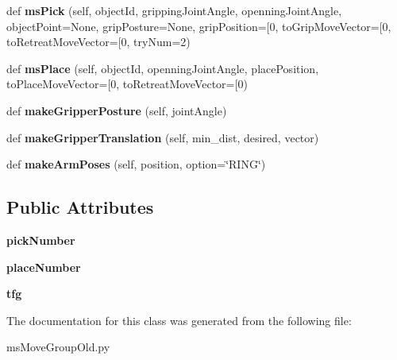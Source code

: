 \begin{DoxyCompactItemize}
\item 
def {\bfseries ms\+Pick} (self, object\+Id, gripping\+Joint\+Angle, openning\+Joint\+Angle, object\+Point=None, grip\+Posture=None, grip\+Position=\mbox{[}0, to\+Grip\+Move\+Vector=\mbox{[}0, to\+Retreat\+Move\+Vector=\mbox{[}0, try\+Num=2)\hypertarget{classmsMoveGroupOld_1_1msMoveGroup_a5859c9d9983ec4e03d57e56f348d4989}{}\label{classmsMoveGroupOld_1_1msMoveGroup_a5859c9d9983ec4e03d57e56f348d4989}

\item 
def {\bfseries ms\+Place} (self, object\+Id, openning\+Joint\+Angle, place\+Position, to\+Place\+Move\+Vector=\mbox{[}0, to\+Retreat\+Move\+Vector=\mbox{[}0)\hypertarget{classmsMoveGroupOld_1_1msMoveGroup_a366b600e9d9d02582df541d94734048d}{}\label{classmsMoveGroupOld_1_1msMoveGroup_a366b600e9d9d02582df541d94734048d}

\item 
def {\bfseries make\+Gripper\+Posture} (self, joint\+Angle)\hypertarget{classmsMoveGroupOld_1_1msMoveGroup_a18bb8b3ececb662a7580203354378e94}{}\label{classmsMoveGroupOld_1_1msMoveGroup_a18bb8b3ececb662a7580203354378e94}

\item 
def {\bfseries make\+Gripper\+Translation} (self, min\+\_\+dist, desired, vector)\hypertarget{classmsMoveGroupOld_1_1msMoveGroup_a933940b988af395523e3a9121d0aaffb}{}\label{classmsMoveGroupOld_1_1msMoveGroup_a933940b988af395523e3a9121d0aaffb}

\item 
def {\bfseries make\+Arm\+Poses} (self, position, option=\char`\"{}R\+I\+NG\char`\"{})\hypertarget{classmsMoveGroupOld_1_1msMoveGroup_ae4f947f53bd380cd899593735f11bea6}{}\label{classmsMoveGroupOld_1_1msMoveGroup_ae4f947f53bd380cd899593735f11bea6}

\end{DoxyCompactItemize}
\subsection*{Public Attributes}
\begin{DoxyCompactItemize}
\item 
{\bfseries pick\+Number}\hypertarget{classmsMoveGroupOld_1_1msMoveGroup_ac350a567d795bb726bacb9c62d7877ea}{}\label{classmsMoveGroupOld_1_1msMoveGroup_ac350a567d795bb726bacb9c62d7877ea}

\item 
{\bfseries place\+Number}\hypertarget{classmsMoveGroupOld_1_1msMoveGroup_ad6352b86f617980bb947f907ac2c5c78}{}\label{classmsMoveGroupOld_1_1msMoveGroup_ad6352b86f617980bb947f907ac2c5c78}

\item 
{\bfseries tfg}\hypertarget{classmsMoveGroupOld_1_1msMoveGroup_a90b06e576bbd2feea38d771a85357610}{}\label{classmsMoveGroupOld_1_1msMoveGroup_a90b06e576bbd2feea38d771a85357610}

\end{DoxyCompactItemize}


The documentation for this class was generated from the following file\+:\begin{DoxyCompactItemize}
\item 
ms\+Move\+Group\+Old.\+py\end{DoxyCompactItemize}
